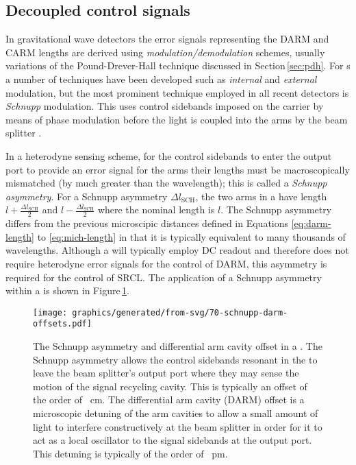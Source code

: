 \subsection{\label{sec:decoupled-sidebands}Decoupled control signals}
In gravitational wave detectors the error signals representing the \gls{DARM} and \gls{CARM} lengths are derived using \emph{modulation/demodulation} schemes, usually variations of the Pound-Drever-Hall technique discussed in Section\,\ref{sec:pdh}. For \MI{}s a number of techniques have been developed such as \emph{internal} and \emph{external} modulation, but the most prominent technique employed in all recent detectors is \emph{Schnupp} modulation. This uses control sidebands imposed on the carrier by means of phase modulation before the light is coupled into the arms by the beam splitter \cite{Heinzel1999}.

In a heterodyne sensing scheme, for the control sidebands to enter the output port to provide an error signal for the arms their lengths must be macroscopically mismatched (by much greater than the wavelength); this is called a \emph{Schnupp asymmetry}. For a Schnupp asymmetry $\Delta l_{\text{SCH}}$, the two arms in a \MI{} have length $l + \frac{\Delta l_{\text{SCH}}}{2}$ and $l - \frac{\Delta l_{\text{SCH}}}{2}$ where the nominal length is $l$. The Schnupp asymmetry differs from the previous microscipic distances defined in Equations \ref{eq:darm-length} to \ref{eq:mich-length} in that it is typically equivalent to many thousands of wavelengths. Although a \DRFPMI{} will typically employ \gls{DC} readout and therefore does not require heterodyne error signals for the control of \gls{DARM}, this asymmetry is required for the control of \gls{SRCL}. The application of a Schnupp asymmetry within a \DRFPMI{} is shown in Figure\,\ref{fig:schnupp-darm-offsets}.

\begin{figure}
  \centering
  \texttt{[image: graphics/generated/from-svg/70-schnupp-darm-offsets.pdf]}
  \caption[Schnupp asymmetry and differential arm cavity offset in a \DRFPMI{}]{\label{fig:schnupp-darm-offsets}The Schnupp asymmetry and differential arm cavity offset in a \DRFPMI{}. The Schnupp asymmetry allows the control sidebands resonant in the \MI{} to leave the beam splitter's output port where they may sense the motion of the signal recycling cavity. This is typically an offset of the order of \SI{}{\centi\meter}. The differential arm cavity (\gls{DARM}) offset is a microscopic detuning of the arm cavities to allow a small amount of light to interfere constructively at the beam splitter in order for it to act as a local oscillator to the signal sidebands at the output port. This detuning is typically of the order of \SI{}{\pico\meter}.}
\end{figure}

